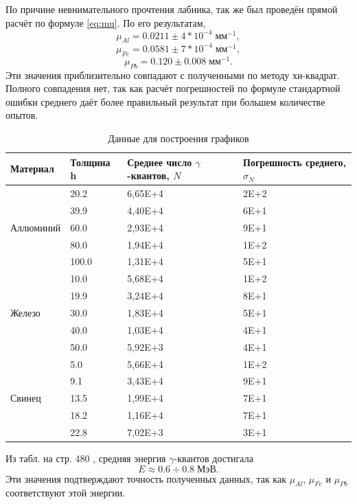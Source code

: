 \documentclass[a4paper]{article}
\begin{document}
По причине невнимательного прочтения лабника, так же был проведён прямой расчёт по формуле \eqref{eq:mu}. По его результатам,
\[
\mu_{Al} = 0.0211\pm 4*10^{-4} \; мм^{-1},
\]
\[
\mu_{Fe} = 0.0581\pm 7*10^{-4} \; мм^{-1},
\]	
\[
\mu_{Pb} = 0.120\pm 0.008 \; мм^{-1}.
\]
Эти значения приблизительно совпадают с полученными по методу хи-квадрат. Полного совпадения нет, так как расчёт погрешностей по формуле стандартной ошибки среднего даёт более правильный результат при большем количестве опытов.
\begin{table}[]
	\centering
	\begin{tabular}{|l|l|l|l|}
		\hline
		Материал & Толщина h & Среднее число $\gamma$-квантов, $N$ & Погрешность среднего, $\sigma_N$ \\ \hline
		\multirow{5}{*}{Аллюминий} & 20.2  & 6,65E+4 & 2E+2 \\ \cline{2-4} 
		& 39.9  & 4,40E+4 & 6E+1 \\ \cline{2-4} 
		& 60.0  & 2,93E+4 & 9E+1 \\ \cline{2-4} 
		& 80.0  & 1,94E+4 & 1E+2 \\ \cline{2-4} 
		& 100.0 & 1,31E+4 & 5E+1 \\ \hline
		\multirow{5}{*}{Железо}    & 10.0  & 5,68E+4 & 1E+2 \\ \cline{2-4} 
		& 19.9  & 3,24E+4 & 8E+1 \\ \cline{2-4} 
		& 30.0  & 1,83E+4 & 5E+1 \\ \cline{2-4} 
		& 40.0  & 1,03E+4 & 4E+1 \\ \cline{2-4} 
		& 50.0  & 5,92E+3 & 4E+1 \\ \hline
		\multirow{5}{*}{Свинец}    & 5.0   & 5,66E+4 & 1E+2 \\ \cline{2-4} 
		& 9.1   & 3,43E+4 & 9E+1 \\ \cline{2-4} 
		& 13.5  & 1,99E+4 & 7E+1 \\ \cline{2-4} 
		& 18.2  & 1,16E+4 & 7E+1 \\ \cline{2-4} 
		& 22.8  & 7,02E+3 & 3E+1 \\ \hline
	\end{tabular}
	\caption{Данные для построения графиков}
	\label{tab:plotData}
\end{table}

Из табл. на стр. 480 \cite{max}, средняя энергия $\gamma$-квантов достигала
\[
	E\approx 0.6 \div 0.8 \; МэВ.
\]
Эти значения подтверждают точность полученных данных, так как $ \mu_{Al} $, $ \mu_{Fe} $ и $ \mu_{Pb} $ соответствуют этой энергии.
\end{document}
